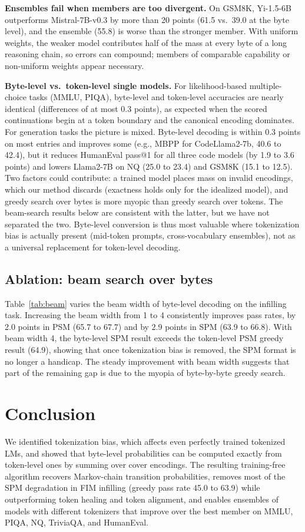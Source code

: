 \documentclass{article} %
\begin{document}
\textbf{Ensembles fail when members are too divergent.} On GSM8K, Yi-1.5-6B outperforms Mistral-7B-v0.3 by more than 20 points (61.5 vs.\ 39.0 at the byte level), and the ensemble (55.8) is worse than the stronger member. With uniform weights, the weaker model contributes half of the mass at every byte of a long reasoning chain, so errors can compound; members of comparable capability or non-uniform weights appear necessary.

\textbf{Byte-level vs.\ token-level single models.} For likelihood-based multiple-choice tasks (MMLU, PIQA), byte-level and token-level accuracies are nearly identical (differences of at most 0.3 points), as expected when the scored continuations begin at a token boundary and the canonical encoding dominates. For generation tasks the picture is mixed. Byte-level decoding is within 0.3 points on most entries and improves some (e.g., MBPP for CodeLlama2-7b, 40.6 to 42.4), but it reduces HumanEval pass@1 for all three code models (by 1.9 to 3.6 points) and lowers Llama2-7B on NQ (25.0 to 23.4) and GSM8K (15.1 to 12.5). Two factors could contribute: a trained model places mass on invalid encodings, which our method discards (exactness holds only for the idealized model), and greedy search over bytes is more myopic than greedy search over tokens. The beam-search results below are consistent with the latter, but we have not separated the two. Byte-level conversion is thus most valuable where tokenization bias is actually present (mid-token prompts, cross-vocabulary ensembles), not as a universal replacement for token-level decoding.

\subsection{Ablation: beam search over bytes}
\label{sec:exp_ablation}

Table~\ref{tab:beam} varies the beam width of byte-level decoding on the infilling task. Increasing the beam width from 1 to 4 consistently improves pass rates, by 2.0 points in PSM (65.7 to 67.7) and by 2.9 points in SPM (63.9 to 66.8). With beam width 4, the byte-level SPM result exceeds the token-level PSM greedy result (64.9), showing that once tokenization bias is removed, the SPM format is no longer a handicap. The steady improvement with beam width suggests that part of the remaining gap is due to the myopia of byte-by-byte greedy search.

\section{Conclusion}
\label{sec:conclusion}
We identified tokenization bias, which affects even perfectly trained tokenized LMs, and showed that byte-level probabilities can be computed exactly from token-level ones by summing over cover encodings. The resulting training-free algorithm recovers Markov-chain transition probabilities, removes most of the SPM degradation in FIM infilling (greedy pass rate 45.0 to 63.9) while outperforming token healing and token alignment, and enables ensembles of models with different tokenizers that improve over the best member on MMLU, PIQA, NQ, TriviaQA, and HumanEval.
\end{document}

